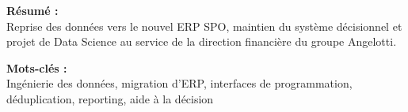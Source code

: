 \begin{titlepage}
\begin{center}
\begin{minipage}[t]{.45\textwidth}
    \centering
    \textbf{Résumé :} \\
    Reprise des données vers le nouvel ERP SPO, maintien du système décisionnel et projet de Data Science au service de la direction financière du groupe Angelotti.
\end{minipage}%
\hspace{0.5cm}
\begin{minipage}[t]{.45\textwidth}
    \centering
    \textbf{Mots-clés :} \\
    Ingénierie des données, migration d'ERP, interfaces de programmation, déduplication, reporting, aide à la décision
\end{minipage}

\vfill
\end{center}
\end{titlepage}
